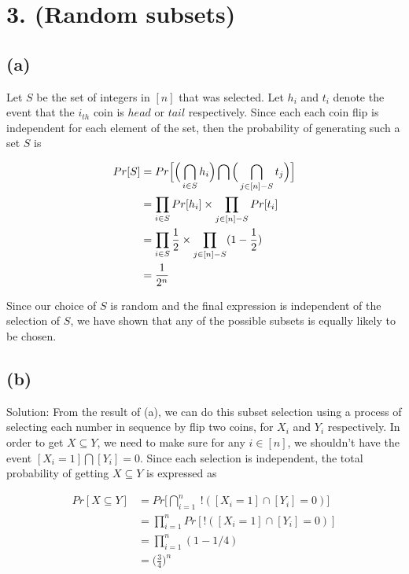 \documentclass[10pt]{537homework}
\author{Peilun Dai}
\begin{document}
\section*{3. (Random subsets) }

\subsection*{(a)} \proof Let $S$ be the set of integers in $[n]$ that was selected. Let $h_i$ and $t_i$ denote the event that the $i_{th}$ coin is $head$ or $tail$ respectively.
Since each each coin flip is independent for each element of the set, then the probability of generating such a set $S$ is 

\begin{align}
	Pr[S] & = Pr\Big[\Big(\bigcap_{i \in S} h_i \Big)\bigcap \Big( \bigcap_{j\in [n]-S} t_j \Big) \Big] \\
	& = \prod_{i \in S} Pr [h_i] \times \prod_{j \in [n] - S} Pr[t_i] \\
	& =  \prod_{i \in S} {1\over 2} \times \prod_{j \in [n] - S} (1 - {1\over 2}) \\
	& = \frac{1}{2^{n}}
\end{align}

Since our choice of $S$ is random and the final expression is independent of the selection of $S$, we have shown that any of the possible subsets is equally likely to be chosen.


\subsection*{(b)} Solution: From the result of (a), we can do this subset selection using a process of selecting each number in sequence by flip two coins, for $X_i$ and $Y_i$ respectively. In order to get $X \subseteq Y$, we need to make sure for any $i \in [n]$, we shouldn't have the event $[X_i = 1] \bigcap [Y_i] = 0$. Since each selection is independent, the total probability of getting $X \subseteq Y$ is expressed as 

\begin{align}
	Pr[X \subseteq Y ] 	& = Pr\Big[\bigcap_{i=1}^n \:!([X_i = 1] \cap [Y_i] = 0)\Big] \\
						& = \prod_{i=1}^n Pr[!([X_i = 1] \cap [Y_i] = 0)] \\
						& = \prod_{i=1}^n (1 - 1/4) \\
						& = \Big(\frac{3}{4}\Big)^n
\end{align} 
\end{document}
